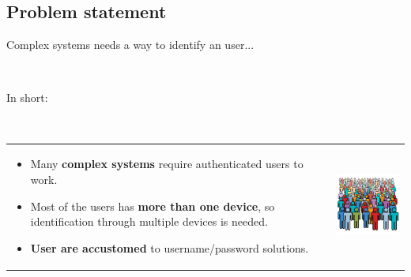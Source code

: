 \documentclass[12pt]{beamer}
\renewcommand{\frametitle}[1]{\vspace{0.2cm}\begin{huge}#1\end{huge}\\}
\renewcommand{\framesubtitle}[1]{\vspace{0.4cm} \hspace{0.4cm}\begin{large}#1\end{large}\\}
\begin{document}
  \subsection{Problem statement}
  \begin{frame}
  \frametitle{Complex systems needs a way to identify an user...}
  \framesubtitle{In short:}
  \begin{table}
  \begin{tabular}{p{7cm}p{3cm}}
  \begin{itemize}
    \item Many \textbf{complex systems} require authenticated users to work.
    \item Most of the users has \textbf{more than one device}, so identification through
      multiple devices is needed.
    \item \textbf{User are accustomed} to username/password solutions.
  \end{itemize}
  &
  \vspace{1.5cm}
  \includegraphics[width=4cm]{../../presentacion/img/users}\\
  \end{tabular}
  \end{table}
  \end{frame}
  
\end{document}
